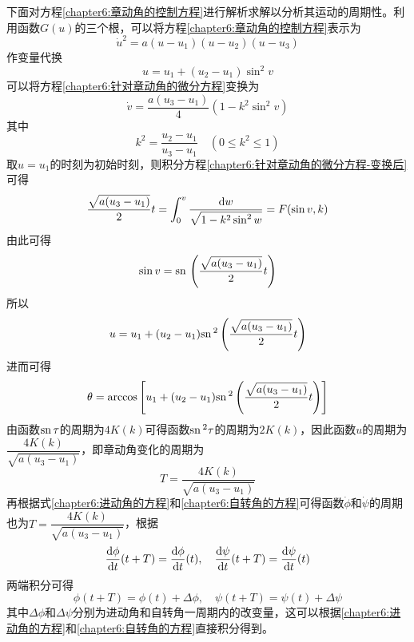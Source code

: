 下面对方程\eqref{chapter6:章动角的控制方程}进行解析求解以分析其运动的周期性。利用函数$G(u)$的三个根，可以将方程\eqref{chapter6:章动角的控制方程}表示为
\begin{equation}
	\dot{u}^2 = a(u-u_1)(u-u_2)(u-u_3)
	\label{chapter6:针对章动角的微分方程}
\end{equation}
作变量代换
\begin{equation}
	u = u_1 + (u_2-u_1)\sin^2v
\end{equation}
可以将方程\eqref{chapter6:针对章动角的微分方程}变换为
\begin{equation}
	\dot{v} = \frac{a(u_3-u_1)}{4}\left(1-k^2\sin^2v\right)
	\label{chapter6:针对章动角的微分方程-变换后}
\end{equation}
其中
\begin{equation}
	k^2=\dfrac{u_2-u_1}{u_3-u_1} \quad (0\leqslant k^2\leqslant 1)
\end{equation}
取$u=u_1$的时刻为初始时刻，则积分方程\eqref{chapter6:针对章动角的微分方程-变换后}可得
\begin{equation}
	\frac{\sqrt{a(u_3-u_1)}}{2}t = \int_0^v \frac{\mathrm{d} w}{\sqrt{1-k^2\sin^2w}} = F(\sin v,k)
\end{equation}
由此可得
\begin{equation}
	\sin v = \mathrm{sn}\, \left(\frac{\sqrt{a(u_3-u_1)}}{2}t\right)
\end{equation}
所以
\begin{equation}
	u = u_1+(u_2-u_1)\mathrm{sn}\,^2 \left(\frac{\sqrt{a(u_3-u_1)}}{2}t\right)
\end{equation}
进而可得
\begin{equation}
	\theta = \arccos \left[u_1+(u_2-u_1)\mathrm{sn}\,^2 \left(\frac{\sqrt{a(u_3-u_1)}}{2}t\right)\right]
\end{equation}
由函数$\mathrm{sn}\, \tau$的周期为$4K(k)$可得函数$\mathrm{sn}\,^2\tau$的周期为$2K(k)$，因此函数$u$的周期为$\dfrac{4K(k)}{\sqrt{a(u_3-u_1)}}$，即章动角变化的周期为
\begin{equation}
	T = \dfrac{4K(k)}{\sqrt{a(u_3-u_1)}}
\end{equation}
再根据式\eqref{chapter6:进动角的方程}和\eqref{chapter6:自转角的方程}可得函数$\dot{\phi}$和$\dot{\psi}$的周期也为$T = \dfrac{4K(k)}{\sqrt{a(u_3-u_1)}}$，根据
\begin{equation}
	\dfrac{\mathrm{d} \phi}{\mathrm{d} t}(t+T) = \dfrac{\mathrm{d} \phi}{\mathrm{d} t}(t),\quad \dfrac{\mathrm{d} \psi}{\mathrm{d} t}(t+T) = \dfrac{\mathrm{d} \psi}{\mathrm{d} t}(t)
\end{equation}
两端积分可得
\begin{equation}
	\phi(t+T)=\phi(t)+\Delta \phi,\quad \psi(t+T)=\psi(t)+\Delta\psi
\end{equation}
其中$\Delta \phi$和$\Delta \psi$分别为进动角和自转角一周期内的改变量，这可以根据\eqref{chapter6:进动角的方程}和\eqref{chapter6:自转角的方程}直接积分得到。

